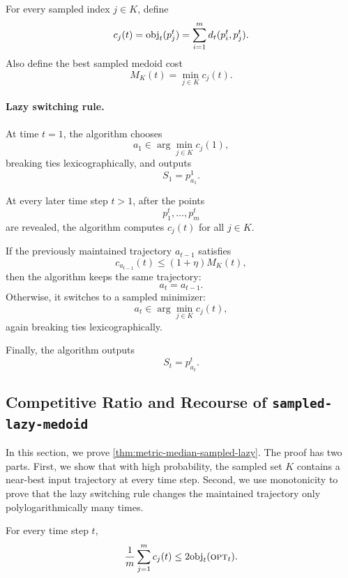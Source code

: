 For every sampled index \(j\in K\), define
\[
    c_j(t)
    =
    \text{obj}_t(p_j^t)
    =
    \sum_{i=1}^m d_t(p_i^t,p_j^t).
\]
Also define the best sampled medoid cost
\[
    M_K(t)
    =
    \min_{j\in K} c_j(t).
\]

\paragraph{Lazy switching rule.}
At time \(t=1\), the algorithm chooses
\[
    a_1\in \arg\min_{j\in K} c_j(1),
\]
breaking ties lexicographically, and outputs
\[
    S_1=p_{a_1}^1.
\]

At every later time step \(t>1\), after the points
\[
    p_1^t,\ldots,p_m^t
\]
are revealed, the algorithm computes \(c_j(t)\) for all \(j\in K\).

If the previously maintained trajectory \(a_{t-1}\) satisfies
\[
    c_{a_{t-1}}(t)
    \le
    (1+\eta)M_K(t),
\]
then the algorithm keeps the same trajectory:
\[
    a_t=a_{t-1}.
\]
Otherwise, it switches to a sampled minimizer:
\[
    a_t\in \arg\min_{j\in K} c_j(t),
\]
again breaking ties lexicographically.

Finally, the algorithm outputs
\[
    S_t=p_{a_t}^t.
\]

\subsection{Competitive Ratio and Recourse of \texttt{sampled-lazy-medoid}}

In this section, we prove \cref{thm:metric-median-sampled-lazy}. The proof has two parts. First, we show that with high probability, the sampled set \(K\) contains a near-best input trajectory at every time step. Second, we use monotonicity to prove that the lazy switching rule changes the maintained trajectory only polylogarithmically many times.

\begin{lemma}
\label{lem:metric-average-medoid}
For every time step \(t\),
\[
    \frac1m
    \sum_{j=1}^m c_j(t)
    \le
    2\text{obj}_t(\textsc{opt}_t).
\]
\end{lemma}

